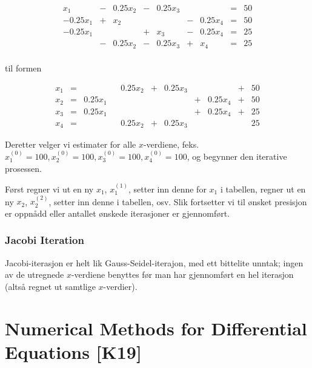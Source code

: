 \documentclass[norsk, a4paper, 12pt, titlepage]{article}
\begin{document}
\begin{equation*}
\begin{array}{rcrcrcrcr}
x_{1}      & - & 0.25x_{2} & - & 0.25x_{3} &   &           & = & 50 \\
-0.25x_{1} & + & x_{2}     &   &           & - & 0.25x_{4} & = & 50 \\
-0.25x_{1} &   &           & + &     x_{3} & - & 0.25x_{4} & = & 25 \\
           & - & 0.25x_{2} & - & 0.25x_{3} & + &     x_{4} & = & 25 \\
\end{array}
\end{equation*}

til formen

\begin{equation*}
\begin{array}{rcrcrcrcrcr}
x_{1} &=&           && 0.25x_{2} &+& 0.25x_{3} & &           &+& 50 \\
x_{2} &=& 0.25x_{1} &&           & &           &+& 0.25x_{4} &+& 50 \\
x_{3} &=& 0.25x_{1} &&           & &           &+& 0.25x_{4} &+& 25 \\
x_{4} &=&           && 0.25x_{2} &+& 0.25x_{3} & &           & & 25
\end{array}
\end{equation*}

Deretter velger vi estimater for alle $x$-verdiene, feks. $x_{1}^{(0)}
= 100, x_{2}^{(0)} = 100, x_{3}^{(0)} = 100, x_{4}^{(0)} = 100$, og
begynner den iterative prosessen.

Først regner vi ut en ny $x_{1}$, $x_{1}^{(1)}$, setter inn denne for
$x_{1}$ i tabellen, regner ut en ny $x_{2}$, $x_{2}^{(2)}$, setter inn denne
i tabellen, osv.  Slik fortsetter vi til ønsket presisjon er oppnådd
eller antallet ønskede iterasjoner er gjennomført.


\subsubsection{Jacobi Iteration}
Jacobi-iterasjon er helt lik Gauss-Seidel-iterajon, med ett bittelite
unntak; ingen av de utregnede $x$-verdiene benyttes før man har
gjennomført en hel iterasjon (altså regnet ut samtlige $x$-verdier).

\newpage
\section{Numerical Methods for Differential Equations [K19]}
\end{document}
